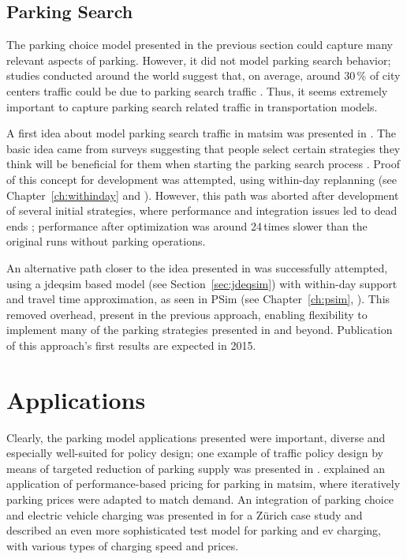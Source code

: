 \subsection{Parking Search}
The parking choice model presented in the previous section could capture many relevant aspects of parking. However, it did not model parking search behavior;  studies conducted around the world suggest that, on average, around 30\,\% of city centers traffic could be due to parking search traffic \citet[][]{Shoup_RSUE_2004}. Thus, it seems extremely important to capture parking search related traffic in transportation models.

A first idea about model parking search traffic in \gls{matsim} was presented in \citet[][]{Waraich_unpub_IATBR_2012}. The basic idea came from surveys suggesting that people select certain strategies they think will be beneficial for them when starting the parking search process \citet[][]{AxhausenPolak_1989}. Proof of this concept for development was attempted, using within-day replanning (see Chapter~\ref{ch:withinday} and \citep[][]{DoblerEtAl_TRR_2012}). However, this path was aborted after development of several initial strategies, where performance and integration issues led to dead ends \citet[][]{WaraichEtAl_unpub_TRB_2013}; performance after optimization was around 24\,times slower than the original runs without parking operations. 

An alternative path closer to the idea presented in \citet[][]{Waraich_unpub_IATBR_2012} was successfully attempted, using a \gls{jdeqsim} based model (see Section~\ref{sec:jdeqsim}) with within-day support and travel time approximation, as seen in PSim (see Chapter~\ref{ch:psim}, \citet[][]{FourieEtAl_TRR_2013}). This removed overhead, present in the previous approach, enabling flexibility to implement many of the parking strategies presented in \citet[][]{AxhausenPolak_1989} and beyond. Publication of this approach's first results are expected in 2015.

\section{Applications}
Clearly, the parking model applications presented were important, diverse  and especially well-suited for policy design; one example of traffic policy design by means of targeted reduction of parking supply was presented in \citet[][]{WaraichAxhausen_TRR_2012}. \citet[][]{WaraichEtAl_unpub_TRB_2013} explained an application of performance-based pricing for parking in \gls{matsim}, where iteratively parking prices were adapted to match demand. An integration of parking choice and electric vehicle charging was presented in \citet[][]{WaraichEtAl_JanssensEtAl_2014} for a Zürich case study and \citet[][]{BemetzHohenfellner_BSCThesis_2014} described an even more sophisticated test model for parking and \gls{ev} charging, with various types of charging speed and prices.

